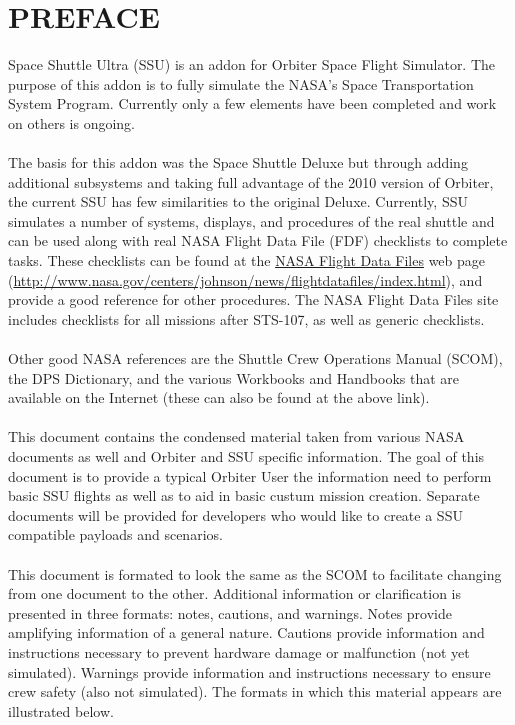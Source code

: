 \documentclass[13pt]{article}
\begin{document}
\section*{PREFACE}
\begin{multicols*}{2}
Space Shuttle Ultra (SSU) is an addon for Orbiter Space Flight Simulator.  The purpose of this addon is to fully simulate the NASA's Space Transportation System Program.  Currently only a few elements have been completed and work on others is ongoing.\\
\\
The basis for this addon was the Space Shuttle Deluxe but through adding additional subsystems and taking full advantage of the 2010 version of Orbiter, the current SSU has few similarities to the original Deluxe.  Currently, SSU simulates a number of systems, displays, and procedures of the real shuttle and can be used along with real NASA Flight Data File (FDF) checklists to complete tasks.  These checklists can be found at the \href{http://www.nasa.gov/centers/johnson/news/flightdatafiles/index.html}{NASA Flight Data Files} web page (\url{http://www.nasa.gov/centers/johnson/news/flightdatafiles/index.html}), and provide a good reference for other procedures. The NASA Flight Data Files site includes checklists for all missions after STS-107, as well as generic checklists. \\
\\
Other good NASA references are the Shuttle Crew Operations Manual (SCOM), the DPS Dictionary, and the various Workbooks and Handbooks that are available on the Internet (these can also be found at the above link). \\
\\
This document contains the condensed material taken from various NASA documents as well and Orbiter and SSU specific information.  The goal of this document is to provide a typical Orbiter User the information need to perform basic SSU flights as well as  to aid in basic custum mission creation.  Separate documents will be provided for developers who would like to create a SSU compatible payloads and scenarios.\\
\\
This document is formated to look the same as the SCOM to facilitate changing from one document to the other.  Additional information or clarification is presented in three formats: notes, cautions, and warnings. Notes provide amplifying information of a general nature. Cautions provide information and instructions necessary to prevent hardware damage or malfunction (not yet simulated). Warnings provide information and instructions necessary to ensure crew safety (also not simulated). The formats in which this material appears are illustrated below.\\

\end{multicols*}
\end{document}

